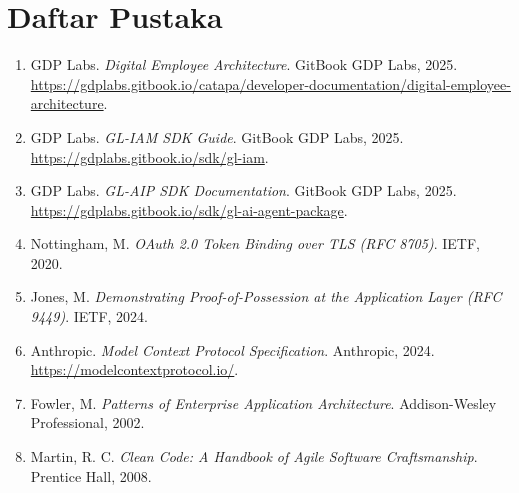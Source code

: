 \section{Daftar Pustaka}

\begin{enumerate}
    \item[1.] GDP Labs. \textit{Digital Employee Architecture}. GitBook GDP Labs, 2025. \url{https://gdplabs.gitbook.io/catapa/developer-documentation/digital-employee-architecture}.

    \item[2.] GDP Labs. \textit{GL-IAM SDK Guide}. GitBook GDP Labs, 2025. \url{https://gdplabs.gitbook.io/sdk/gl-iam}.

    \item[3.] GDP Labs. \textit{GL-AIP SDK Documentation}. GitBook GDP Labs, 2025. \url{https://gdplabs.gitbook.io/sdk/gl-ai-agent-package}.

    \item[4.] Nottingham, M. \textit{OAuth 2.0 Token Binding over TLS (RFC 8705)}. IETF, 2020.

    \item[5.] Jones, M. \textit{Demonstrating Proof-of-Possession at the Application Layer (RFC 9449)}. IETF, 2024.

    \item[6.] Anthropic. \textit{Model Context Protocol Specification}. Anthropic, 2024. \url{https://modelcontextprotocol.io/}.

    \item[7.] Fowler, M. \textit{Patterns of Enterprise Application Architecture}. Addison-Wesley Professional, 2002.

    \item[8.] Martin, R. C. \textit{Clean Code: A Handbook of Agile Software Craftsmanship}. Prentice Hall, 2008.
\end{enumerate}

\clearpage

